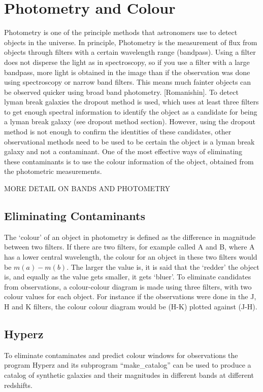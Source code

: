 
\section{Photometry and Colour} %
\label{section:Photometry_Colour}
	Photometry is one of the principle methods that astronomers use to detect objects in the universe. In principle, Photometry is the measurement of flux from objects through filters with a certain wavelength range (bandpass). Using a filter does not disperse the light as in spectroscopy, so if you use a filter with a large bandpass, more light is obtained in the image than if the observation was done using spectroscopy or narrow band filters. This means much fainter objects can be observed quicker using broad band photometry. [Romanishin]. To detect lyman break galaxies the dropout method is used, which uses at least three filters to get enough spectral information to identify the object as a candidate for being a lyman break galaxy (see dropout method section). However,  using the dropout method is not enough to confirm the identities of these candidates, other observational methods need to be used to be certain the object is a lyman break galaxy and not a contaminant. One of the most effective ways of eliminating these contaminants is to use the colour information of the object, obtained from the photometric measurements.

	MORE DETAIL ON BANDS AND PHOTOMETRY

    \subsection{Eliminating Contaminants} %
    \label{sub:Eliminating_Contanimants}
		The ‘colour’ of an object in photometry is defined as the difference in magnitude between two filters. If there are two filters, for example called A and B, where A has a lower central wavelength, the colour for an object in these two filters would be $m(a)-m(b)$. The larger the value is, it is said that the ‘redder’ the object is, and equally as the value gets smaller, it gets ‘bluer’. To eliminate candidates from observations, a colour-colour diagram is made using three filters, with two colour values for each object. For instance if the observations were done in the J, H and K filters, the colour colour diagram would be (H-K) plotted against (J-H).

    \subsection{Hyperz} %
	\label{sub:Hyperz}
		To eliminate contaminates and predict colour windows for observations the program Hyperz and its subprogram ``make\_catalog'' can be used to produce a catalog of synthetic galaxies and their magnitudes in different bands at different redshifts.

